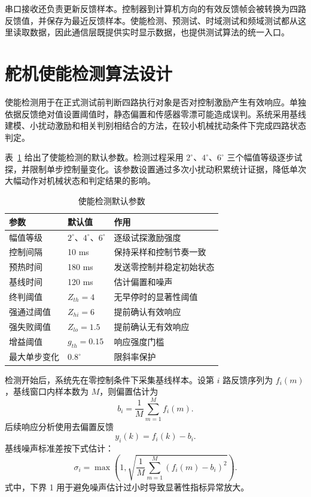 串口接收还负责更新反馈样本。控制器到计算机方向的有效反馈帧会被转换为四路反馈值，并保存为最近反馈样本。使能检测、预测试、时域测试和频域测试都从这里读取数据，因此通信层既提供实时显示数据，也提供测试算法的统一入口。

\section{舵机使能检测算法设计}

使能检测用于在正式测试前判断四路执行对象是否对控制激励产生有效响应。单独依据反馈绝对值设置阈值时，静态偏置和传感器零漂可能造成误判。系统采用基线建模、小扰动激励和相关判别相结合的方法，在较小机械扰动条件下完成四路状态判定。

表~\ref{tab:enable-detection-params} 给出了使能检测的默认参数。检测过程采用 $2^\circ$、$4^\circ$、$6^\circ$ 三个幅值等级逐步试探，并限制单步控制量变化。该参数设置通过多次小扰动积累统计证据，降低单次大幅动作对机械状态和判定结果的影响。

\begin{table}[htb]
  \centering
  \caption{使能检测默认参数}
  \label{tab:enable-detection-params}
  \small
  \begin{tabular}{@{}p{}p{}p{}@{}}
    \toprule
    参数 & 默认值 & 作用 \\
    \midrule
    幅值等级 & $2^\circ$、$4^\circ$、$6^\circ$ & 逐级试探激励强度 \\
    控制间隔 & 10 ms & 保持采样和控制节奏一致 \\
    预热时间 & 180 ms & 发送零控制并稳定初始状态 \\
    基线时间 & 120 ms & 估计偏置和噪声 \\
    终判阈值 & $Z_{th}=4$ & 无早停时的显著性阈值 \\
    强通过阈值 & $Z_{hi}=6$ & 提前确认有效响应 \\
    强失败阈值 & $Z_{lo}=1.5$ & 提前确认无有效响应 \\
    增益阈值 & $g_{th}=0.15$ & 响应强度门槛 \\
    最大单步变化 & $0.8^\circ$ & 限斜率保护 \\
    \bottomrule
  \end{tabular}
\end{table}

检测开始后，系统先在零控制条件下采集基线样本。设第 $i$ 路反馈序列为 $f_i(m)$，基线窗口内样本数为 $M$，则偏置估计为
\begin{equation}
  b_i=\frac{1}{M}\sum_{m=1}^{M}f_i(m).
\end{equation}
后续响应分析使用去偏置反馈
\begin{equation}
  y_i(k)=f_i(k)-b_i.
\end{equation}
基线噪声标准差按下式估计：
\begin{equation}
  \sigma_i=\max\left(1,\sqrt{\frac{1}{M}\sum_{m=1}^{M}\left(f_i(m)-b_i\right)^2}\right).
\end{equation}
式中，下界 1 用于避免噪声估计过小时导致显著性指标异常放大。

